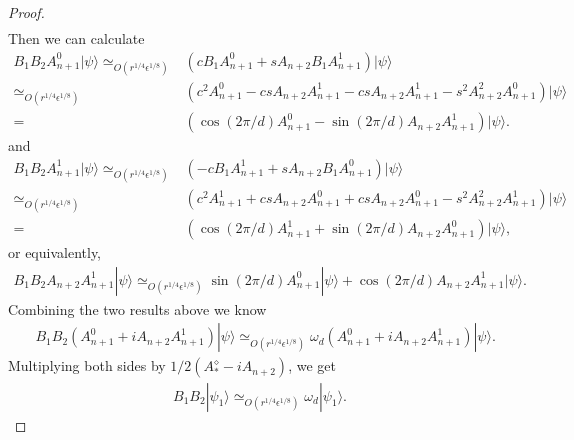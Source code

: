 \documentclass[11pt,letterpaper]{article}
\newcommand{\ket}[1]{|#1\rangle}
\newcommand{\1}{\mathbb{1}}
\newcommand{\ep}{\epsilon}
\newcommand{\appd}[1]{\simeq_{#1}}
\theoremstyle{definition}
\begin{document}
\begin{proof}
\begin{align}
        \end{align}
        Then we can calculate
        \begin{align}
        		B_1B_2 A_{n+1}^0 \ket{\psi} \appd{O(r^{1/4}\ep^{1/8})}& (c B_1A_{n+1}^0 +sA_{n+2}B_1A_{n+1}^1)\ket{\psi}\\
        		\appd{O(r^{1/4}\ep^{1/8})}&(c^2A_{n+1}^0- csA_{n+2}A_{n+1}^1 -csA_{n+2}A_{n+1}^1 -s^2 A_{n+2}^2 A_{n+1}^0)\ket{\psi}\\
        		=& (\cos(2\pi/d) A_{n+1}^0 - \sin(2\pi/d) A_{n+2}A_{n+1}^1)\ket{\psi}.
        \end{align}
        and 
        \begin{align}
        		B_1B_2 A_{n+1}^1 \ket{\psi} \appd{O(r^{1/4}\ep^{1/8})}& (-c B_1A_{n+1}^1 +sA_{n+2}B_1A_{n+1}^0)\ket{\psi}\\
        		\appd{O(r^{1/4}\ep^{1/8})}&(c^2A_{n+1}^1+ csA_{n+2}A_{n+1}^0 +csA_{n+2}A_{n+1}^0 -s^2 A_{n+2}^2 A_{n+1}^1)\ket{\psi}\\
        		=& (\cos(2\pi/d) A_{n+1}^1 + \sin(2\pi/d) A_{n+2}A_{n+1}^0)\ket{\psi},
        \end{align}
        or equivalently,
        \begin{align}
        		B_1B_2 A_{n+2}A_{n+1}^1 \ket{\psi}\appd{O(r^{1/4}\ep^{1/8})} 
		\sin(2\pi/d) A_{n+1}^0\ket{\psi} + \cos(2\pi/d)A_{n+2}A_{n+1}^1\ket{\psi}.
        \end{align}
        Combining the two results above we know
	\begin{align}
		\label{eq:omegad}&B_1B_2 (A_{n+1}^0 + i A_{n+2}A_{n+1}^1) \ket{\psi} 
		\appd{O(r^{1/4}\ep^{1/8})}\omega_d(A_{n+1}^0 + iA_{n+2}A_{n+1}^1) \ket{\psi}.
	\end{align}
	Multiplying both sides by $1/2(A_\ast^\diamond - iA_{n+2})$, we get
	\begin{align}
		B_1B_2 \ket{\psi_1} \appd{O(r^{1/4}\ep^{1/8})} \omega_d\ket{\psi_1}.
	\end{align}
	

\end{proof}
\end{document}
